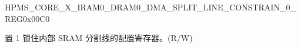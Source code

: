 \begin{register}{H}{PMS\_CORE\_X\_IRAM0\_DRAM0\_DMA\_SPLIT\_LINE\_CONSTRAIN\_0\_REG}{0x{}00C0}\label{regdesc:PMSCOREXIRAM0DRAM0DMASPLITLINECONSTRAIN0REG}
%
%
\regnewline%
\begin{regdesc}\begin{reglist}
\label{fielddesc:PMSCOREXIRAM0DRAM0DMASPLITLINECONSTRAINLOCK}\item [PMS\_CORE\_X\_IRAM0\_DRAM0\_DMA\_SPLIT\_LINE\_CONSTRAIN\_LOCK] 置 1 锁住内部 SRAM 分割线的配置寄存器。(R/W)
\end{reglist}\end{regdesc}
\end{register}



